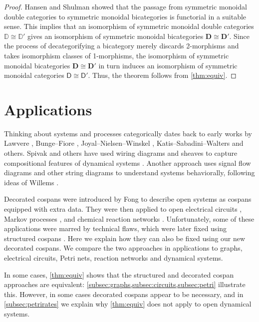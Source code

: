 \documentclass[ a4paper, onecolumn, superscriptaddress,10pt, accepted=2022-02-14, issue=3, volume=4, shorttitle=papers/compositionality-4-3 ]{compositionalityarticle}
\newcommand{\D}{\mathsf{D}}
\newcommand{\bicat}{\mathbf}
\newcommand{\bD}{\bicat{D}}
\newcommand{\double}[1]{\mathbf{\mathbb #1}}
\newcommand{\lD}{\double{D}}
\begin{document}
\begin{proof}
Hansen and Shulman \cite{HS} showed that the passage from symmetric monoidal double categories to symmetric monoidal bicategories is functorial in a suitable sense.  This implies that an isomorphism of symmetric monoidal double categories $\lD \cong \lD'$ gives an isomorphism of symmetric monoidal bicategories $\bD \cong \bD'$.    Since the process of decategorifying a bicategory merely discards 2-morphisms and takes isomorphism classes of 1-morphisms, the isomorphism of symmetric monoidal bicategories $\bD \cong \bD'$ in turn induces an isomorphism of symmetric monoidal categories $\D \cong \D'$.   Thus, the theorem follows from \cref{thm:equiv}. \end{proof}

\section{Applications}\label{Applications}

Thinking about systems and processes categorically dates back to early works by Lawvere \cite{Lawvere}, Bunge--Fiore \cite{BungeFiore}, Joyal--Nielsen--Winskel \cite{JNW}, Katis--Sabadini--Walters \cite{KSW} and others.   Spivak and others have used wiring diagrams and sheaves to capture compositional features of dynamical systems \cite{BFV,SSV,VSL}.  Another approach uses signal flow diagrams and other string diagrams \cite{BE,BSZ,FRS} to understand systems behaviorally, following ideas of Willems \cite{Willems}.

Decorated cospans were introduced by Fong \cite{Fong,FongThesis} to describe open systems as cospans equipped with extra data.  They were then applied to open electrical circuits \cite{BF}, Markov processes \cite{BFP}, and chemical reaction networks \cite{BP}.  Unfortunately, some of these applications were marred by technical flaws, which were later fixed using structured cospans \cite{BC}. Here we explain how they can also be fixed using our new decorated cospans.  We compare the two approaches in applications to graphs, electrical circuits, Petri nets, reaction networks and dynamical systems.

In some cases, \cref{thm:equiv} shows that the structured and decorated cospan approaches are equivalent: \cref{subsec:graphs,subsec:circuits,subsec:petri} illustrate this.  However, in some cases decorated cospans appear to be necessary, and in \cref{subsec:petrirates} we explain why \cref{thm:equiv} does not apply to open dynamical systems.
\end{document}
